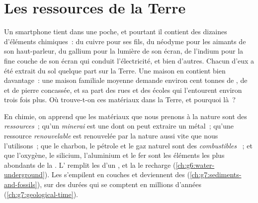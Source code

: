 \chapter{Les ressources de la Terre}\label{ch:g9:earth-resources}

Un smartphone tient dans une poche, et pourtant il contient des dizaines
d'éléments chimiques~: du cuivre pour ses fils, du néodyme pour les aimants
de son haut-parleur, du gallium pour la lumière de son écran, de l'indium
pour la fine couche de son écran qui conduit l'électricité, et bien
d'autres. Chacun d'eux a été extrait du sol quelque part sur la Terre. Une
maison en contient bien davantage~: une maison familiale moyenne demande
environ cent tonnes de , de  et de pierre concassée, et sa
part des rues et des écoles qui l'entourent environ trois fois plus. Où
trouve-t-on ces matériaux dans la Terre, et pourquoi là~?

\begin{recall}
En chimie, on apprend que les matériaux que nous prenons à la nature sont
des \emph{ressources}~; qu'un \emph{minerai} est une  dont on peut
extraire un métal~; qu'une ressource \emph{renouvelable} est renouvelée
par la nature aussi vite que nous l'utilisons~; que le charbon, le pétrole
et le gaz naturel sont des \emph{combustibles }~; et que
l'oxygène, le silicium, l'aluminium et le fer sont les éléments les plus
abondants de la . L' remplit les  d'un
, et la  le recharge (\cref{ch:g6:water-underground}). Les
 s'empilent en couches et deviennent des 
(\cref{ch:g7:sediments-and-fossils}), sur des durées qui se comptent en
millions d'années (\cref{ch:g7:geological-time}).
\end{recall}

